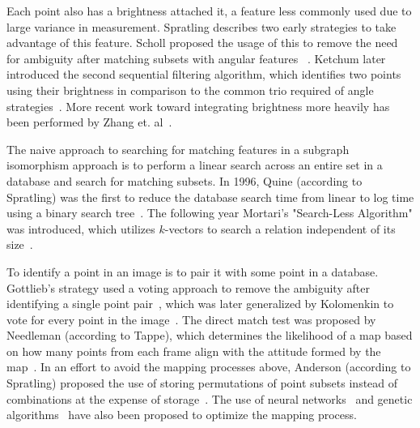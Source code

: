 
Each point also has a brightness attached it, a feature less commonly used due to large variance in measurement.
Spratling describes two early strategies to take advantage of this feature.
Scholl proposed the usage of this to remove the need for ambiguity after matching subsets with angular features ~\cite{scholl:starFieldIdentification}.
Ketchum later introduced the second sequential filtering algorithm, which identifies two points using their brightness in comparison to the common trio required of angle strategies~\cite{ketchum:onboardStarIdentification}.
More recent work toward integrating brightness more heavily has been performed by Zhang et. al~\cite{zhang:brightnessReferenced}.

The naive approach to searching for matching features in a subgraph isomorphism approach is to perform a linear search across an entire set in a database and search for matching subsets.
In 1996, Quine (according to Spratling) was the first to reduce the database search time from linear to log time using a binary search tree~\cite{quine:fastAutonomousStarAcquistion}.
The following year Mortari's "Search-Less Algorithm" was introduced, which utilizes $k$-vectors to search a relation independent of its size~\cite{mortari:kVectorApproach}.

\newcommand{\srightarrow}{\! \rightarrow \!}
To identify a point in an image is to pair it with some point in a database.
Gottlieb's strategy used a voting approach to remove the ambiguity after identifying a single point pair~\cite{gottlieb:spacecraftAttitudeDetermination}, which was later generalized by Kolomenkin to vote for every point in the image~\cite{kolomenkin:geometricVoting}.
The direct match test was proposed by Needleman (according to Tappe), which determines the likelihood of a map based on how many points from each frame align with the attitude formed by the map~\cite{needelman:stellarAttitudeAcquisition}.
In an effort to avoid the mapping processes above, Anderson (according to Spratling) proposed the use of storing permutations of point subsets instead of combinations at the expense of storage~\cite{anderson:autonomousStarSensing}.
The use of neural networks~\cite{lindsey:neuralNetworkMethods,alvelda:neuralNetworkStar} and genetic algorithms~\cite{paladugu:geneticAlgorithms} have also been proposed to optimize the mapping process.
